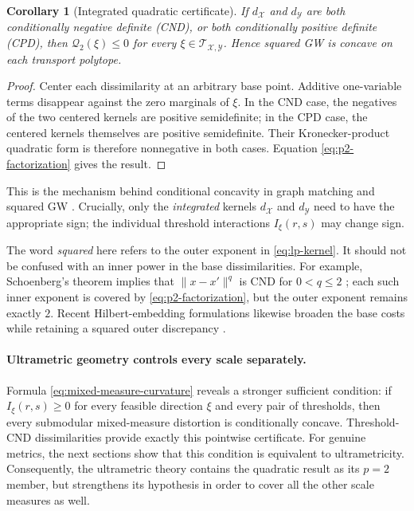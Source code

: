 \documentclass[11pt,a4paper]{article}
\newtheorem{corollary}[theorem]{Corollary}
\theoremstyle{definition}
\theoremstyle{remark}
\newcommand{\Tcal}{\mathcal T}
\newcommand{\Qcal}{\mathcal Q}
\begin{document}
\begin{corollary}[Integrated quadratic certificate]
\label{cor:quadratic-integrated-certificate}
If \(d_{\mathcal X}\) and \(d_{\mathcal Y}\) are both conditionally negative
definite (CND), or both conditionally positive definite (CPD), then
\(\Qcal_2(\xi)\leq0\) for every
\(\xi\in\Tcal_{\mathcal X,\mathcal Y}\).  Hence squared GW is concave on each
transport polytope.
\end{corollary}

\begin{proof}
Center each dissimilarity at an arbitrary base point.  Additive one-variable
terms disappear against the zero marginals of \(\xi\).  In the CND case, the
negatives of the two centered kernels are positive semidefinite; in the CPD
case, the centered kernels themselves are positive semidefinite.  Their
Kronecker-product quadratic form is therefore nonnegative in both cases.
Equation \eqref{eq:p2-factorization} gives the result.
\end{proof}

This is the mechanism behind conditional concavity in graph matching and
squared GW \citep{MaronLipman2018,SejourneVialardPeyre2021}.  Crucially, only
the \emph{integrated} kernels \(d_{\mathcal X}\) and
\(d_{\mathcal Y}\) need to have the appropriate sign; the individual
threshold interactions \(I_\xi(r,s)\) may change sign.

The word \emph{squared} here refers to the outer exponent in
\eqref{eq:lp-kernel}.  It should not be confused with an inner power in the
base dissimilarities.  For example, Schoenberg's theorem implies that
\(\lVert x-x'\rVert^q\) is CND for \(0<q\leq2\)
\citep{Schoenberg1938}; each such inner exponent is covered by
\eqref{eq:p2-factorization}, but the outer exponent remains exactly \(2\).
Recent Hilbert-embedding formulations likewise broaden the base costs while
retaining a squared outer discrepancy \citep{HouryFeydyVialard2026}.

\paragraph{Ultrametric geometry controls every scale separately.}
Formula \eqref{eq:mixed-measure-curvature} reveals a stronger sufficient
condition: if \(I_\xi(r,s)\geq0\) for every feasible direction \(\xi\) and
every pair of thresholds, then every submodular mixed-measure distortion is
conditionally concave.  Threshold-CND dissimilarities provide exactly this
pointwise certificate.  For genuine metrics, the next sections show that this
condition is equivalent to ultrametricity.  Consequently, the ultrametric
theory contains the quadratic result as its \(p=2\) member, but strengthens
its hypothesis in order to cover all the other scale measures as well.
\end{document}
